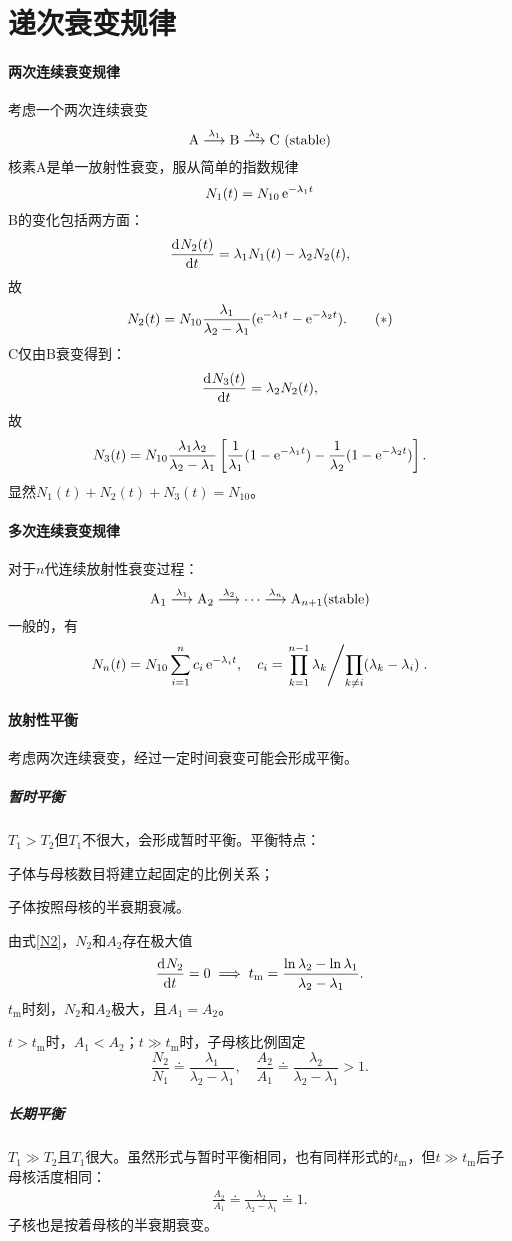 \section{递次衰变规律}

\paragraph{两次连续衰变规律}
考虑一个两次连续衰变
\[
	\mathrm{A}\overset{\lambda_1}{\longrightarrow }\mathrm{B}\overset{\lambda_2}{\longrightarrow }\mathrm{C}~(\mathrm{stable})
\]
核素A是单一放射性衰变，服从简单的指数规律
\[
	N_1(t)=N_{10}\mathop{}\!\mathrm{e}^{-\lambda_1t}
\]
B的变化包括两方面：
\[
	\frac{\mathrm{d}^{{}}N_2(t)}{\mathrm{d}{t}^{{}}}=\lambda_1N_1(t)-\lambda_2N_2(t),
\]
故
\[\label{N2}
	N_2(t)=N_{10}\frac{\lambda_1}{\lambda_2-\lambda_1}(\mathop{}\!\mathrm{e}^{-\lambda_1t}-\mathop{}\!\mathrm{e}^{-\lambda_2t}).\tag{$\ast$}
\]
C仅由B衰变得到：
\[
	\frac{\mathrm{d}^{{}}N_3(t)}{\mathrm{d}{t}^{{}}}=\lambda_2N_2(t),
\]
故
\[
	N_3(t)=N_{10}\frac{\lambda_1\lambda_2}{\lambda_2-\lambda_1}\left[\frac1{\lambda_1}(1-\mathop{}\!\mathrm{e}^{-\lambda_1t})-\frac1{\lambda_2}(1-\mathop{}\!\mathrm{e}^{-\lambda_2t})\right].
\]
显然$N_1(t)+N_2(t)+N_3(t)=N_{10}$。
\paragraph{多次连续衰变规律}
对于$n$代连续放射性衰变过程：
\[
	\mathrm{A}_1\overset{\lambda_1}{\longrightarrow }\mathrm{A}_2\overset{\lambda_2}{\longrightarrow }\cdots\overset{\lambda_n}{\longrightarrow }\mathrm{A}_{n+1}(\mathrm{stable})
\]
一般的，有
\[
	N_n(t)=N_{10}\sum_{i=1}^nc_i\mathop{}\!\mathrm{e}^{-\lambda_it},\quad c_i=\left.{\prod_{k=1}^{n-1}\lambda_k}\middle/{\prod_{k\neq i}(\lambda_k-\lambda_i)}\right..
\]
\paragraph{放射性平衡}考虑两次连续衰变，经过一定时间衰变可能会形成平衡。
\subparagraph{暂时平衡}$T_1>T_2$但$T_1$不很大，会形成暂时平衡。平衡特点：
\begin{compactenum}
	\item 子体与母核数目将建立起固定的比例关系；
	\item 子体按照母核的半衰期衰减。
\end{compactenum}
由式\eqref{N2}，$N_2$和$A_2$存在极大值
\begin{align}
	\frac{\mathrm{d}^{{}}N_2}{\mathrm{d}{t}^{{}}}=0\implies t_\mathrm m=\frac{\ln\lambda_2-\ln\lambda_1}{\lambda_2-\lambda_1}.
\end{align}
$t_\mathrm m$时刻，$N_2$和$A_2$极大，且$A_1=A_2$。

$t>t_\mathrm m$时，$A_1<A_2$；$t\gg t_\mathrm m$时，子母核比例固定
\[
	\frac{N_2}{N_1}\doteq\frac{\lambda_1}{\lambda_2-\lambda_1},\quad\frac{A_2}{A_1}\doteq\frac{\lambda_2}{\lambda_2-\lambda_1}>1.
\]
\subparagraph{长期平衡}$T_1\gg T_2$且$T_1$很大。虽然形式与暂时平衡相同，也有同样形式的$t_\mathrm m$，但$t\gg t_\mathrm m$后子母核活度相同：
\begin{align}
	\frac{A_2}{A_1}\doteq\frac{\lambda_2}{\lambda_2-\lambda_1}\doteq 1.
\end{align}
子核也是按着母核的半衰期衰变。

